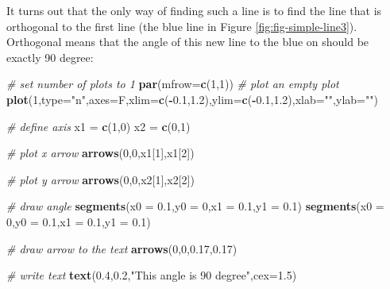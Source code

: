 \documentclass[
]{book}
\newenvironment{Shaded}{\begin{snugshade}}{\end{snugshade}}
\newcommand{\CommentTok}[1]{\textcolor[rgb]{0.56,0.35,0.01}{\textit{#1}}}
\newcommand{\DataTypeTok}[1]{\textcolor[rgb]{0.13,0.29,0.53}{#1}}
\newcommand{\DecValTok}[1]{\textcolor[rgb]{0.00,0.00,0.81}{#1}}
\newcommand{\FloatTok}[1]{\textcolor[rgb]{0.00,0.00,0.81}{#1}}
\newcommand{\KeywordTok}[1]{\textcolor[rgb]{0.13,0.29,0.53}{\textbf{#1}}}
\newcommand{\NormalTok}[1]{#1}
\newcommand{\OperatorTok}[1]{\textcolor[rgb]{0.81,0.36,0.00}{\textbf{#1}}}
\newcommand{\StringTok}[1]{\textcolor[rgb]{0.31,0.60,0.02}{#1}}
\theoremstyle{definition}
\theoremstyle{definition}
\theoremstyle{definition}
\theoremstyle{remark}
\begin{document}
It turns out that the only way of finding such a line is to find the line that is orthogonal to the first line (the blue line in Figure \ref{fig:fig-simple-line3}). Orthogonal means that the angle of this new line to the blue on should be exactly 90 degree:

\begin{Shaded}
\begin{Highlighting}[]
\CommentTok{# set number of plots to 1}
\KeywordTok{par}\NormalTok{(}\DataTypeTok{mfrow=}\KeywordTok{c}\NormalTok{(}\DecValTok{1}\NormalTok{,}\DecValTok{1}\NormalTok{))}
\CommentTok{# plot an empty plot}
\KeywordTok{plot}\NormalTok{(}\DecValTok{1}\NormalTok{,}\DataTypeTok{type=}\StringTok{"n"}\NormalTok{,}\DataTypeTok{axes=}\NormalTok{F,}\DataTypeTok{xlim=}\KeywordTok{c}\NormalTok{(}\OperatorTok{-}\FloatTok{0.1}\NormalTok{,}\FloatTok{1.2}\NormalTok{),}\DataTypeTok{ylim=}\KeywordTok{c}\NormalTok{(}\OperatorTok{-}\FloatTok{0.1}\NormalTok{,}\FloatTok{1.2}\NormalTok{),}\DataTypeTok{xlab=}\StringTok{""}\NormalTok{,}\DataTypeTok{ylab=}\StringTok{""}\NormalTok{)}

\CommentTok{# define axis}
\NormalTok{x1 =}\StringTok{ }\KeywordTok{c}\NormalTok{(}\DecValTok{1}\NormalTok{,}\DecValTok{0}\NormalTok{)}
\NormalTok{x2 =}\StringTok{ }\KeywordTok{c}\NormalTok{(}\DecValTok{0}\NormalTok{,}\DecValTok{1}\NormalTok{)}

\CommentTok{# plot x arrow}
\KeywordTok{arrows}\NormalTok{(}\DecValTok{0}\NormalTok{,}\DecValTok{0}\NormalTok{,x1[}\DecValTok{1}\NormalTok{],x1[}\DecValTok{2}\NormalTok{])}


\CommentTok{# plot y arrow}
\KeywordTok{arrows}\NormalTok{(}\DecValTok{0}\NormalTok{,}\DecValTok{0}\NormalTok{,x2[}\DecValTok{1}\NormalTok{],x2[}\DecValTok{2}\NormalTok{])}

\CommentTok{# draw angle }
\KeywordTok{segments}\NormalTok{(}\DataTypeTok{x0 =} \FloatTok{0.1}\NormalTok{,}\DataTypeTok{y0 =} \DecValTok{0}\NormalTok{,}\DataTypeTok{x1 =} \FloatTok{0.1}\NormalTok{,}\DataTypeTok{y1 =} \FloatTok{0.1}\NormalTok{)}
\KeywordTok{segments}\NormalTok{(}\DataTypeTok{x0 =} \DecValTok{0}\NormalTok{,}\DataTypeTok{y0 =} \FloatTok{0.1}\NormalTok{,}\DataTypeTok{x1 =} \FloatTok{0.1}\NormalTok{,}\DataTypeTok{y1 =} \FloatTok{0.1}\NormalTok{)}

\CommentTok{# draw arrow to the text}
\KeywordTok{arrows}\NormalTok{(}\DecValTok{0}\NormalTok{,}\DecValTok{0}\NormalTok{,}\FloatTok{0.17}\NormalTok{,}\FloatTok{0.17}\NormalTok{)}

\CommentTok{# write text}
\KeywordTok{text}\NormalTok{(}\FloatTok{0.4}\NormalTok{,}\FloatTok{0.2}\NormalTok{,}\StringTok{"This angle is 90 degree"}\NormalTok{,}\DataTypeTok{cex=}\FloatTok{1.5}\NormalTok{)}
\end{Highlighting}
\end{Shaded}
\end{document}
